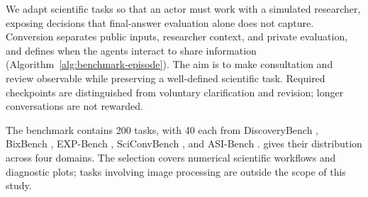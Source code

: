 We adapt scientific tasks so that an actor must work with a simulated
researcher, exposing decisions that final-answer evaluation alone does not
capture. Conversion separates public inputs, researcher context, and private
evaluation, and defines when the agents interact to share information
(Algorithm~\ref{alg:benchmark-episode}). The aim is to make consultation and
review observable while preserving a well-defined scientific task. Required
checkpoints are distinguished from voluntary clarification and revision;
longer conversations are not rewarded.

The benchmark contains 200 tasks, with 40 each from DiscoveryBench
\cite{majumder2024discoverybench}, BixBench \cite{mitchener2025bixbench},
EXP-Bench \cite{kon2025expbench}, SciConvBench
\cite{somasekharan2026sciconvbench}, and ASI-Bench \cite{zhou2026asibench}.
 gives their distribution across four
domains. The selection covers numerical scientific workflows and diagnostic
plots; tasks involving image processing are outside the scope of this study.
\par\medskip\noindent
